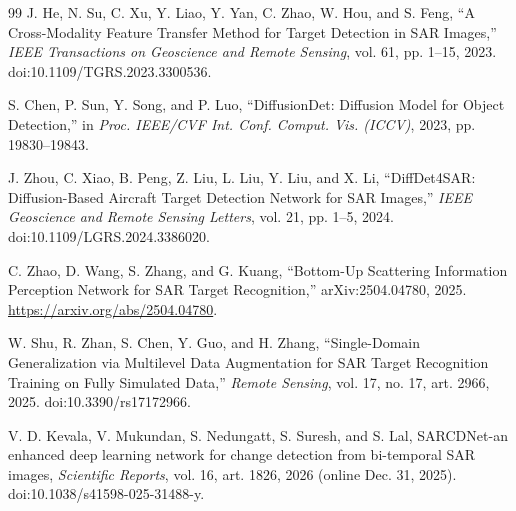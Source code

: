 \documentclass[journal]{IEEEtran}
\begin{document}
\begin{thebibliography}{99}
J. He, N. Su, C. Xu, Y. Liao, Y. Yan, C. Zhao, W. Hou, and S. Feng,
``A Cross-Modality Feature Transfer Method for Target Detection in SAR Images,''
\emph{IEEE Transactions on Geoscience and Remote Sensing},
vol. 61, pp. 1--15, 2023. doi:10.1109/TGRS.2023.3300536.

S. Chen, P. Sun, Y. Song, and P. Luo,
``DiffusionDet: Diffusion Model for Object Detection,''
in \emph{Proc. IEEE/CVF Int. Conf. Comput. Vis. (ICCV)},
2023, pp. 19830--19843.

J. Zhou, C. Xiao, B. Peng, Z. Liu, L. Liu, Y. Liu, and X. Li,
``DiffDet4SAR: Diffusion-Based Aircraft Target Detection Network for SAR Images,''
\emph{IEEE Geoscience and Remote Sensing Letters},
vol. 21, pp. 1--5, 2024. doi:10.1109/LGRS.2024.3386020.

C. Zhao, D. Wang, S. Zhang, and G. Kuang, ``Bottom-Up Scattering Information Perception Network for SAR Target Recognition,'' arXiv:2504.04780, 2025. \url{https://arxiv.org/abs/2504.04780}.

W. Shu, R. Zhan, S. Chen, Y. Guo, and H. Zhang, ``Single-Domain Generalization via Multilevel Data Augmentation for SAR Target Recognition Training on Fully Simulated Data,'' \emph{Remote Sensing}, vol. 17, no. 17, art. 2966, 2025. doi:10.3390/rs17172966.

V. D. Kevala, V. Mukundan, S. Nedungatt, S. Suresh, and S. Lal, SARCDNet-an enhanced deep learning network for change detection from bi-temporal SAR images, \emph{Scientific Reports}, vol. 16, art. 1826, 2026 (online Dec. 31, 2025). doi:10.1038/s41598-025-31488-y.
\end{thebibliography}
\end{document}
